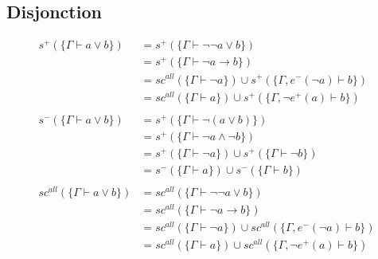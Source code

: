 \documentclass[12pt]{article}
\begin{document}
\subsection*{Disjonction}
\begin{align*}
  s^+ (\{\Gamma \vdash a \lor b\})      & = s^+ (\{\Gamma \vdash \neg \neg a \lor b\})                                            \\
                                        & = s^+ (\{\Gamma \vdash \neg a \rightarrow b\})                                          \\
                                        & = sc^{all} (\{\Gamma \vdash \neg a\}) \cup s^+ (\{\Gamma, e^-(\neg a) \vdash b\})       \\
                                        & = sc^{all} (\{\Gamma \vdash a\}) \cup s^+ (\{\Gamma, \neg e^+(a) \vdash b\})            \\
  \\
  s^- (\{\Gamma \vdash a \lor b\})      & = s^+ (\{\Gamma \vdash \neg (a \lor b)\})                                               \\
                                        & = s^+ (\{\Gamma \vdash \neg a \land \neg b\})                                           \\
                                        & = s^+ (\{\Gamma \vdash \neg a\}) \cup s^+ (\{\Gamma \vdash \neg b\})                    \\
                                        & = s^- (\{\Gamma \vdash a\}) \cup s^- (\{\Gamma \vdash b\})                              \\
  \\
  sc^{all} (\{\Gamma \vdash a \lor b\}) & = sc^{all} (\{\Gamma \vdash \neg \neg a \lor b \})                                      \\
                                        & = sc^{all} (\{\Gamma \vdash \neg a \rightarrow b \})                                    \\
                                        & = sc^{all} (\{\Gamma \vdash \neg a \}) \cup sc^{all} (\{\Gamma, e^- (\neg a)\vdash b\}) \\
                                        & = sc^{all} (\{\Gamma \vdash a\}) \cup sc^{all} (\{\Gamma, \neg e^+ (a)\vdash b\})       \\
\end{align*}
\end{document}
